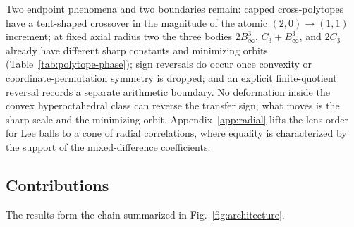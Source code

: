 \documentclass[pdflatex,sn-mathphys-num]{sn-jnl}
\theoremstyle{thmstyleone}
\theoremstyle{thmstylethree}
\theoremstyle{thmstyletwo}
\begin{document}
Two endpoint phenomena and two boundaries remain:
capped cross-polytopes have a tent-shaped crossover in the magnitude of the
atomic $(2,0)\to(1,1)$ increment; at fixed axial radius two the three bodies
$2B_\infty^3$, $C_3+B_\infty^3$, and $2C_3$ already have different sharp
constants and minimizing orbits (Table~\ref{tab:polytope-phase}); sign
reversals do occur once convexity or coordinate-permutation symmetry is
dropped; and an explicit finite-quotient reversal records a separate
arithmetic boundary.  No deformation inside the convex hyperoctahedral class
can reverse the transfer sign; what moves is the sharp scale and the
minimizing orbit.  Appendix~\ref{app:radial} lifts the lens order for Lee
balls to a cone of radial correlations, where equality is characterized by
the support of the mixed-difference coefficients.

\subsection{Contributions}

The results form the chain summarized in Fig.~\ref{fig:architecture}.
\end{document}
